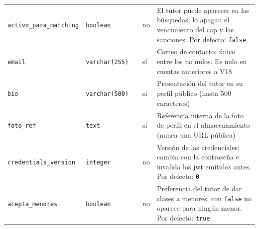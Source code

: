 {\begin{xltabular}{\textwidth}{@{}>{\raggedright\arraybackslash}p{3.6cm} >{\raggedright\arraybackslash}p{2.3cm} >{\raggedright\arraybackslash}p{1cm} >{\centering\arraybackslash}p{0.85cm} L@{}}
    \texttt{activo\_\allowbreak{}para\_\allowbreak{}matching} & \texttt{boolean} &  & no & El tutor puede aparecer en las búsquedas; lo apagan el vencimiento del \gls{cap} y las sanciones. Por defecto: \texttt{false} \\
    \texttt{email} & \texttt{varchar(\allowbreak{}255)} &  & sí & Correo de contacto; único entre los no nulos. Es nulo en cuentas anteriores a V18 \\
    \texttt{bio} & \texttt{varchar(\allowbreak{}500)} &  & sí & Presentación del tutor en su perfil público (hasta 500 caracteres) \\
    \texttt{foto\_\allowbreak{}ref} & \texttt{text} &  & sí & Referencia interna de la foto de perfil en el almacenamiento (nunca una URL pública) \\
    \texttt{credentials\_\allowbreak{}version} & \texttt{integer} &  & no & Versión de las credenciales; cambia con la contraseña e invalida los \gls{jwt} emitidos antes. Por defecto: \texttt{0} \\
    \texttt{acepta\_\allowbreak{}menores} & \texttt{boolean} &  & no & Preferencia del tutor de dar clases a menores; con \texttt{false} no aparece para ningún menor. Por defecto: \texttt{true} \\
\end{xltabular}
}

